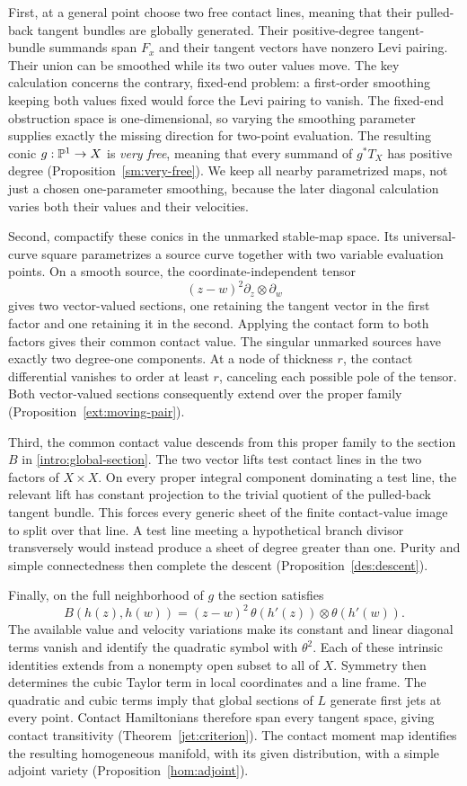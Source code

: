 First, at a general point choose two free contact lines, meaning
that their pulled-back tangent bundles are globally generated.
Their positive-degree tangent-bundle summands span $F_x$ and their tangent
vectors have nonzero Levi pairing. Their union can be smoothed
while its two outer values move. The key calculation concerns
the contrary, fixed-end problem: a first-order smoothing keeping
both values fixed would force the Levi pairing to vanish. The
fixed-end obstruction space is one-dimensional, so varying the
smoothing parameter supplies exactly the missing direction for
two-point evaluation. The resulting conic $g:\mathbb P^1\to X$ is
\emph{very free}, meaning that every summand of $g^*T_X$ has
positive degree (Proposition~\ref{sm:very-free}). We keep all
nearby parametrized maps, not just a chosen one-parameter
smoothing, because the later diagonal calculation varies both
their values and their velocities.

Second, compactify these conics in the unmarked stable-map
space. Its universal-curve square parametrizes a source curve
together with two variable evaluation points. On a smooth source,
the coordinate-independent tensor
\[
 (z-w)^2\partial_z\otimes\partial_w
\]
gives two vector-valued sections, one retaining the tangent vector
in the first factor and one retaining it in the second. Applying
the contact form to both factors gives their common contact value.
The singular unmarked sources have exactly two degree-one
components. At a node of thickness $r$, the contact differential
vanishes to order at least $r$, canceling each possible pole of
the tensor. Both vector-valued sections consequently extend over
the proper family (Proposition~\ref{ext:moving-pair}).

Third, the common contact value descends from this proper family
to the section $B$ in \eqref{intro:global-section}. The two vector
lifts test contact lines in the two factors of $X\times X$.
On every proper integral component dominating a test line, the
relevant lift has constant projection to the trivial quotient of
the pulled-back tangent bundle. This forces every generic sheet
of the finite contact-value image to split over that line. A test
line meeting a hypothetical branch divisor transversely would
instead produce a sheet of degree greater than one. Purity and
simple connectedness then complete the descent
(Proposition~\ref{des:descent}).

Finally, on the full neighborhood of $g$ the section satisfies
\[
 B(h(z),h(w))=(z-w)^2\,
 \theta(h'(z))\otimes\theta(h'(w)).
\]
The available value and velocity variations make its constant
and linear diagonal terms vanish and identify the quadratic
symbol with $\theta^2$. Each of these intrinsic identities
extends from a nonempty open subset to all of $X$. Symmetry then
determines the cubic Taylor term in local coordinates and a line
frame. The quadratic and cubic terms imply that global sections
of $L$ generate first jets at every point. Contact Hamiltonians
therefore span every tangent space, giving contact transitivity
(Theorem~\ref{jet:criterion}). The contact moment map identifies
the resulting homogeneous manifold, with its given distribution,
with a simple adjoint variety (Proposition~\ref{hom:adjoint}).

